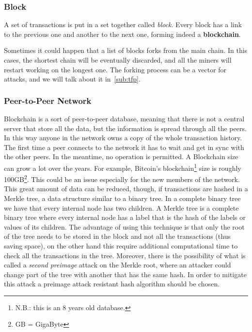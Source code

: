\subsubsection{Block}
A set of transactions is put in a set together called \textit{block}. Every
block has a link to the previous one and another to the next one, forming
indeed a \textbf{blockchain}.

\label{sub:fork}
Sometimes it could happen that a list of blocks forks from the main chain. In
this cases, the shortest chain will be eventually discarded, and all the miners
will restart working on the longest one\cite{sok15}. The forking process can be
a vector for attacks, and we will talk about it in~\ref{sub:tfp}.

\subsubsection{Peer-to-Peer Network}

Blockchain is a sort of peer-to-peer database, meaning that there is not a
central server that store all the data, but the information is spread through
all the peers.
In this way anyone in the network owns a copy of the whole transaction history.
The first time a peer connects to the network it has to wait and get in sync
with the other peers. In the meantime, no operation is permitted. A Blockchain
size can grow a lot over the years. For example, Bitcoin's
blockchain\footnote{N.B.: this is an 8 years old database.} size is roughly
100GB\footnote{GB = GigaByte}. This could be an issue especially for the new
members of the network.
This great amount of data can be reduced, though, if transactions are hashed in
a Merkle tree, a data structure similar to a binary tree. In a complete binary
tree we have that every internal node has two children. A Merkle tree is
a complete binary tree where every internal node has a label that is the hash
of the labels or values of its children\cite{szydlo04}. The advantage of using
this technique is that only the root of the tree needs to be stored in the
block and not all the transactions\cite{nakamoto08} (thus saving space), on the
other hand this require additional computational time to check all the
transactions in the tree. Moreover, there is the possibility of what is called a
\textit{second preimage} attack on the Merkle root, where an attacker could
change part of the tree with another that has the same hash\cite{rogaway04}. In
order to mitigate this attack a preimage attack resistant hash algorithm should
be chosen.


